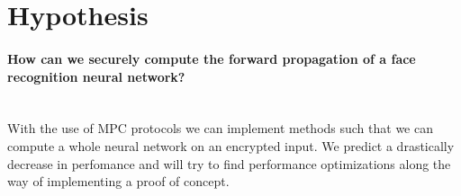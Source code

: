 \section{Hypothesis}
\paragraph{How can we securely compute the forward propagation of a face recognition neural network?}\mbox{} \\
With the use of MPC protocols we can implement methods such that we can compute a whole neural network on an encrypted input. We predict a drastically decrease in perfomance and will try to find performance optimizations along the way of implementing a proof of concept.
